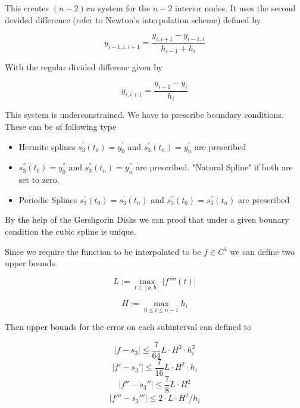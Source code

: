 \documentclass[
    a4paper,
    11pt
]{article}
\begin{document}
This creates $(n-2) x n$ system for the $n-2$ interior nodes. It uses the second
devided difference (refer to Newton's interpolation scheme) defined by

\begin{equation}
    y_{i-1,i,i+1} = \frac{y_{i,i+1} - y_{i-1,i}}{h_{i-1} + h_i}
\end{equation}

With the regular divided differenc given by

\begin{equation}
    y_{i, i+1} = \frac{y_{i+1} - y_i}{h_{i}}
\end{equation}

This system is underconstrained. We have to prescribe boundary conditions. These
can be of following type

\begin{itemize}
    \item Hermite splines $s_3^{'}(t_0) = y_0^{'}$ and $s_3^{'}(t_n) = y_n^{'}$ are
        prescribed
    \item $s_3^{''}(t_0) = y_0^{''}$ and $s_3^{''}(t_n) = y_n^{''}$ are
        prescribed. "Natural Spline" if both are set to zero.
    \item Periodic Splines $s_3^{'}(t_0) = s_3^{'}(t_n)$ and $s_3^{''}(t_0) =
        s_3^{''}(t_n)$ are prescribed
\end{itemize}

By the help of the Gershgorin Disks we can proof that under a given bounary
condition the cubic spline is unique.

Since we require the function to be interpolated to be $f \in \mathit{C}^4$ we
can define two upper bounds.

\begin{equation}
    L := \max_{t \in [a,b]} | f''''(t)|
\end{equation}

\begin{equation}
    H := \max_{0 \leq i \leq n-1} h_i
\end{equation}

Then upper bounds for the error on each subinterval can defined to

\begin{equation}
    |f - s_3| \leq \frac{7}{64} L \cdot H^2 \cdot h_i^2
\end{equation}
\begin{equation}
    |f' - s_3'| \leq \frac{7}{16} L \cdot H^2 \cdot h_i
\end{equation}
\begin{equation}
    |f'' - s_3''| \leq \frac{7}{8} L \cdot H^2 
\end{equation}
\begin{equation}
    |f''' - s_3'''| \leq 2 \cdot L \cdot H^2 / h_i
\end{equation}
\end{document}
